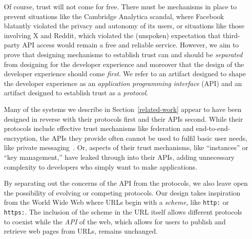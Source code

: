 Of course, trust will not come for free.
There must be mechanisms in place to prevent situations like
the Cambridge Analytica scandal, where Facebook blatantly violated the
privacy and autonomy of its users,
or situations like those involving X and Reddit, which violated
the (unspoken) expectation that third-party API access would
remain a free and reliable service.
However, we aim to prove that designing mechanisms to establish trust can and should be
\emph{separated} from designing for the developer experience and moreover that
the design of the developer experience should come \emph{first}.
We refer to an artifact designed to shape the developer experience as an
\emph{application programming interface} (API)
and an artifact designed
to establish trust as a \emph{protocol}.

Many of the systems we describe in Section~\ref{related-work} appear to
have been designed in reverse with their protocols first and their APIs second.
While their protocols include effective trust mechanisms like federation and end-to-end-encryption,
the APIs they provide often cannot be used to fulfil basic user needs, like private messaging~\cite{bluesky}.
Or, aspects of their trust mechanisms,
like ``instances'' or ``key management,''
have leaked through into their APIs,
adding unnecessary complexity to developers
who simply want to make applications.

By separating out the concerns of the API from the protocols,
we also leave open the possibility of evolving or competing protocols.
Our design takes inspiration from the World Wide Web
where URLs begin with a \emph{scheme}, like \texttt{http:} or \texttt{https:}. The inclusion of the scheme
in the URL itself allows different protocols to coexist
while the \emph{API} of the web, which allows for users to publish and retrieve
web pages from URLs, remains unchanged.

